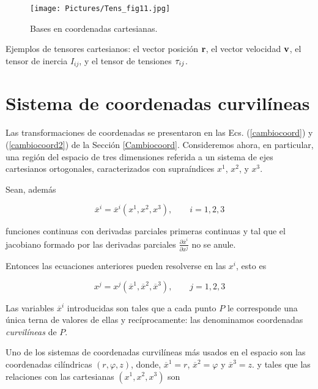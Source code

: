 \begin{figure}[ht]
\label{Tens_fig11}
\begin{center}
\texttt{[image: Pictures/Tens\_fig11.jpg]}
\caption{Bases en coordenadas cartesianas.}
\end{center}
\end{figure}

Ejemplos de tensores cartesianos: el vector posición $\bold{r}$, el vector velocidad $\bold{v}$, el  tensor de inercia $I_{ij}$,  y el tensor de tensiones  $\bold{\tau}_{ij} $.

\section{Sistema de coordenadas curvilíneas}
Las transformaciones de coordenadas se presentaron en las Ecs.
(\ref{cambiocoord}) y  (\ref{cambiocoord2}) de la Sección \ref{Cambiocoord}. Consideremos ahora, en particular, una región del espacio de tres dimensiones referida a un sistema de ejes cartesianos ortogonales,  caracterizados con  supraíndices $x^{1}$, $x^{2}$, y $x^{3}$.

Sean, además
 
\begin{equation}
\overline x^{i} = \overline x^{i}( x^1, x^{2}, x^{3}),  \qquad i=1,2,3
\label{transf1}
\end{equation}



\noindent
funciones continuas con derivadas parciales primeras continuas y tal que el 
jacobiano formado por las derivadas parciales $\frac{\partial \overline x^i}{\partial  x^j}$  no se anule.

\bigskip


Entonces las ecuaciones anteriores pueden resolverse en las $x^{i} $, esto es


\begin{equation}
x^{j} = x^{j}(\overline x^1,\overline x^{2}, \overline x^{3}),  \qquad j=1,2,3
\label{transf2}
\end{equation}

\bigskip

Las variables $\overline x^{i}$ introducidas  son tales que a cada punto $P$   le corresponde una única terna de valores de ellas y recíprocamente: las denominamos coordenadas \textit{curvilíneas} de $P$.


Uno de los  sistemas de  coordenadas curvilíneas más usados en el espacio son las coordenadas cilíndricas $(r,\varphi,z)$, donde,
$\overline x^{1}=r$, $\overline x^{2}=\varphi$ y $\overline x^{3}=z$.
y tales que las  relaciones con las cartesianas $  ( x^1, x^{2}, x^{3})$ son 


